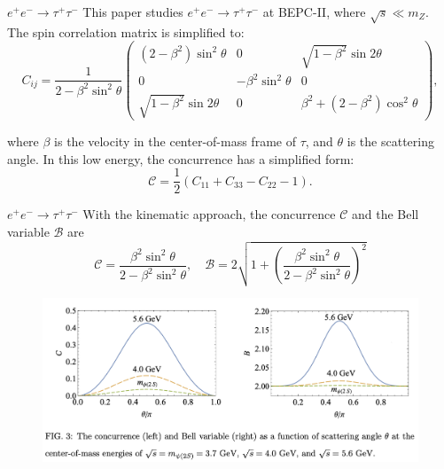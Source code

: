 \documentclass{beamer}
\begin{document}
    \begin{frame}{$e^+e^-\to \tau^+\tau^-$ \footnotesize {}}
        This paper studies $e^+e^-\to \tau^+\tau^-$ at BEPC-II, where $\sqrt{s}\ll m_Z$. 
        The spin correlation matrix is simplified to:
        \begin{equation*}
            C_{ij} = \frac{1}{2-\beta^2\sin^2{\theta}}\left(
            \begin{array}{ccc}
                 (2-\beta^2)\sin^2{\theta} & 0 & \sqrt{1-\beta^2}\sin{2\theta}  \\
                 0 & -\beta^2\sin^2{\theta} & 0 \\
                 \sqrt{1-\beta^2}\sin{2\theta} & 0 & \beta^2+(2-\beta^2)\cos^2{\theta}
            \end{array}
            \right),
        \end{equation*}
        \begin{center}
            \footnotesize {}
        \end{center}
        where $\beta$ is the velocity in the center-of-mass frame of $\tau$, and $\theta$ is the scattering angle.
        In this low energy, the concurrence has a simplified form:
        \begin{equation*}
            \mathcal{C} = \frac{1}{2}\left(C_{11} + C_{33} - C_{22} -1 \right).
        \end{equation*}
    \end{frame}

    \begin{frame}{$e^+e^-\to \tau^+\tau^-$ \footnotesize {}}
        With the kinematic approach, the concurrence $\mathcal{C}$ and the Bell variable $\mathcal{B}$ are
        \begin{equation*}
            \mathcal{C} = \frac{\beta^2\sin^2\theta}{2-\beta^2\sin^2\theta}, \quad
            \mathcal{B} = 2\sqrt{1+\left(\frac{\beta^2\sin^2\theta}{2-\beta^2\sin^2\theta}\right)^2}
        \end{equation*}
        \begin{figure}[htbp]
            \centering
            \includegraphics[width=0.7\linewidth]{img/eetautau1.png}
        \end{figure}        
    \end{frame}
\end{document}
